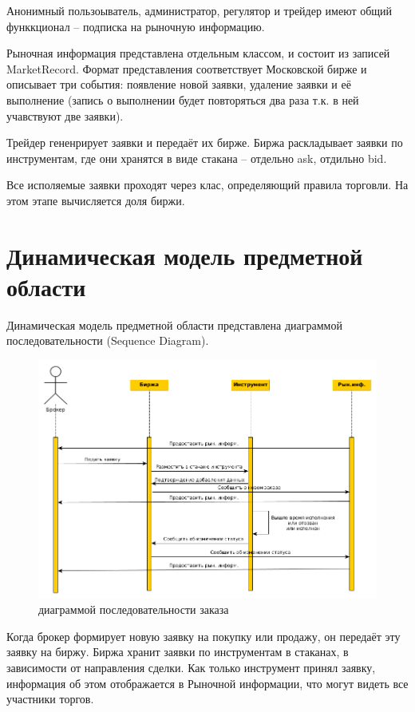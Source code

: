 \documentclass[a4paper, 12pt]{article}        %
\begin{document}
Анонимный пользоыватель, администратор, регулятор и трейдер имеют общий функкционал -- подписка на рыночную информацию.

Рыночная информация представлена отдельным классом, и состоит из записей MarketRecord. Формат представления соответствует Московской бирже и описывает три события: появление новой заявки, удаление заявки и её выполнение (запись о выполнении будет повторяться два раза т.к. в ней учавствуют две заявки).

Трейдер гененрирует заявки и передаёт их бирже. Биржа раскладывает заявки по инструментам, где они хранятся в виде стакана -- отдельно ask, отдильно bid.

Все исполяемые заявки проходят через клас, определяющий правила торговли. На этом этапе вычисляется доля биржи.

\newpage
\section{Динамическая модель предметной области}

Динамическая модель предметной области представлена диаграммой последовательности (Sequence Diagram).

\begin{figure}[h!]
\centering
\includegraphics[scale=0.57]{res/pic08}
\caption{диаграммой последовательности заказа}
\end{figure}

Когда брокер формирует новую заявку на покупку или продажу, он передаёт эту заявку на биржу. Биржа хранит заявки по инструментам в стаканах, в зависимости от направления сделки. Как только инструмент принял заявку, информация об этом отображается в Рыночной информации, что могут видеть все участники торгов.
\end{document}
